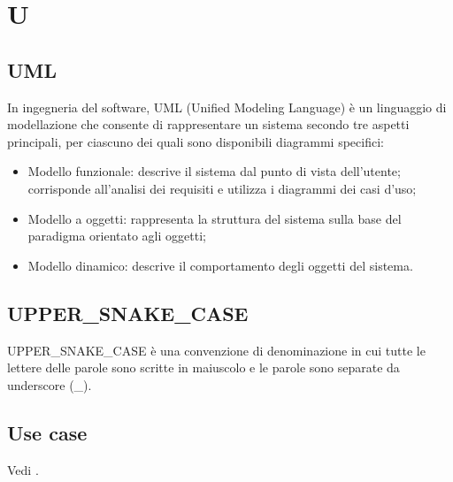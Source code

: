 \section{U}

\vspace{2em}
\subsection*{UML}
\par In ingegneria del software, UML (Unified Modeling Language) è un linguaggio di modellazione che consente di rappresentare un sistema secondo tre aspetti principali, per ciascuno dei quali sono disponibili diagrammi specifici:
\begin{itemize}
  \item Modello funzionale: descrive il sistema dal punto di vista dell'utente; corrisponde all'analisi dei requisiti e utilizza i diagrammi dei casi d'uso;
  \item Modello a oggetti: rappresenta la struttura del sistema sulla base del paradigma orientato agli oggetti;
  \item Modello dinamico: descrive il comportamento degli oggetti del sistema.
\end{itemize}

\vspace{2em}
\subsection*{UPPER\_SNAKE\_CASE}
\par UPPER\_SNAKE\_CASE è una convenzione di denominazione in cui tutte le lettere delle parole sono scritte in maiuscolo e le parole sono separate da underscore (\_).

\vspace{2em}
\subsection*{Use case}
\par Vedi .
